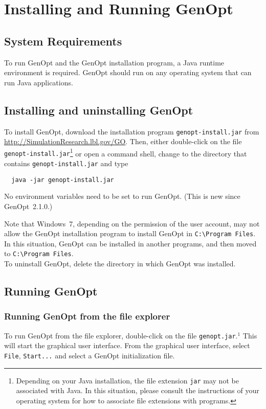 \chapter{Installing and Running GenOpt}
\label{sec:InsAndRunGen}
\section{System Requirements}
To run GenOpt and the GenOpt installation program, a Java \javaversion runtime environment is required.
GenOpt should run on any operating system that can run Java applications.

\section{Installing and uninstalling GenOpt}
To install GenOpt, download the installation program
{\tt genopt-install.jar} from
\url{http://SimulationResearch.lbl.gov/GO}.
Then, either double-click on the file {\tt genopt-install.jar}\footnote{Depending on your Java installation, the file extension {\tt jar} may not be associated with Java. In this situation, please consult the instructions of your operating system for how to associate file extensions with programs.}
or open a command shell, change to the directory that contains {\tt genopt-install.jar} and type
\begin{lstlisting}
  java -jar genopt-install.jar
\end{lstlisting}
No environment variables need to be set to run GenOpt. (This is new since GenOpt~2.1.0.)

Note that Windows~7, depending on the permission of the user account, may not allow the GenOpt installation program to install GenOpt in {\tt C:\textbackslash Program Files}. In this situation, GenOpt can be installed in another programs, and then moved to {\tt C:\textbackslash Program Files}.\\

To uninstall GenOpt, delete the directory in which GenOpt was installed.

\section{Running GenOpt}
\subsection{Running GenOpt from the file explorer}
To run GenOpt from the file explorer,
double-click on the file {\tt genopt.jar}.$^1$
This will start the graphical user interface. 
From the graphical user interface, select {\tt File},
{\tt Start...} and select a GenOpt initialization file.

